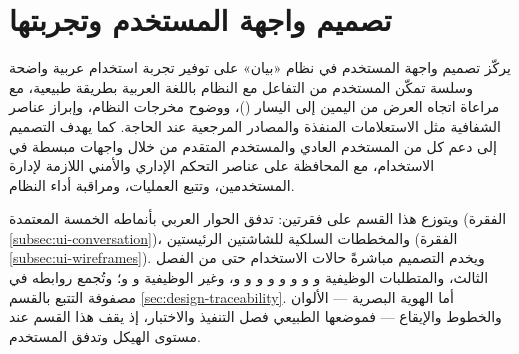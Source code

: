 \section{تصميم واجهة المستخدم وتجربتها}
\label{sec:ui-design}

يركّز تصميم واجهة المستخدم في نظام «بيان» على توفير تجربة استخدام عربية واضحة وسلسة تمكّن المستخدم من التفاعل مع النظام باللغة العربية بطريقة طبيعية، مع مراعاة اتجاه العرض من اليمين إلى اليسار ()، ووضوح مخرجات النظام، وإبراز عناصر الشفافية مثل الاستعلامات المنفذة والمصادر المرجعية عند الحاجة. كما يهدف التصميم إلى دعم كل من المستخدم العادي والمستخدم المتقدم من خلال واجهات مبسطة في الاستخدام، مع المحافظة على عناصر التحكم الإداري والأمني اللازمة لإدارة المستخدمين، وتتبع العمليات، ومراقبة أداء النظام.

ويتوزع هذا القسم على فقرتين: تدفق الحوار العربي بأنماطه الخمسة المعتمدة (الفقرة \ref{subsec:ui-conversation})، والمخططات السلكية للشاشتين الرئيستين (الفقرة \ref{subsec:ui-wireframes}). ويخدم التصميم مباشرةً حالات الاستخدام  حتى  من الفصل الثالث، والمتطلبات الوظيفية  و و و و و و و و، وغير الوظيفية  و و؛ وتُجمع روابطه في مصفوفة التتبع بالقسم \ref{sec:design-traceability}. أما الهوية البصرية — الألوان والخطوط والإيقاع — فموضعها الطبيعي فصل التنفيذ والاختبار، إذ يقف هذا القسم عند مستوى الهيكل وتدفق المستخدم.

